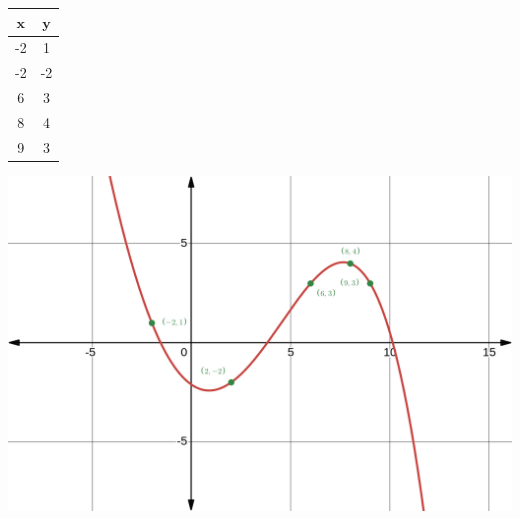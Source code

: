 \documentclass[a4paper,11pt]{article}
\begin{document}
\noindent
\begin{minipage}{0.2\textwidth}
\begin{table}[H]
	\center 
	\begin{tabular} { c | c }
		$\mathbf{x}$ & $\mathbf{y}$ \\ 
		\hline 
		-2 & 1 \\
		-2 & -2 \\
		6 & 3 \\
		8 & 4 \\
		9 & 3 \\
	\end{tabular}
\end{table}
\end{minipage}
\hfill
\begin{minipage}{0.8\textwidth}
	\begin{center}
	\includegraphics[scale=0.2]{../figures/lagrange_interpol.png}
	\end{center}
\end{minipage}
\end{document}
